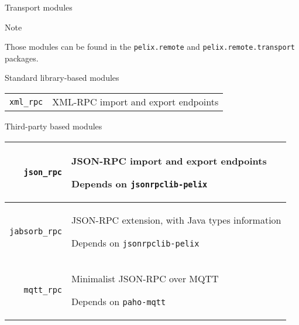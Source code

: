 \begin{frame}{Transport modules}
\begin{exampleblock}{Note}
\begin{small}
Those modules can be found in the \texttt{pelix.remote} and \texttt{pelix.remote.transport} packages.
\end{small}
\end{exampleblock}

\begin{block}{Standard library-based modules}
\begin{small}
\begin{tabular}{rp{}}
\texttt{xml\_rpc} & XML-RPC import and export endpoints \\
\end{tabular}
\end{small}
\end{block}

\begin{block}{Third-party based modules}
\begin{small}
\begin{tabular}{rp{}}
\texttt{json\_rpc} & JSON-RPC import and export endpoints \par Depends on \texttt{jsonrpclib-pelix} \\
\hline
\texttt{jabsorb\_rpc} & JSON-RPC extension, with Java types information \par Depends on \texttt{jsonrpclib-pelix} \\
\hline
\texttt{mqtt\_rpc} & Minimalist JSON-RPC over MQTT \par Depends on \texttt{paho-mqtt} \\
\end{tabular}
\end{small}
\end{block}
\end{frame}
